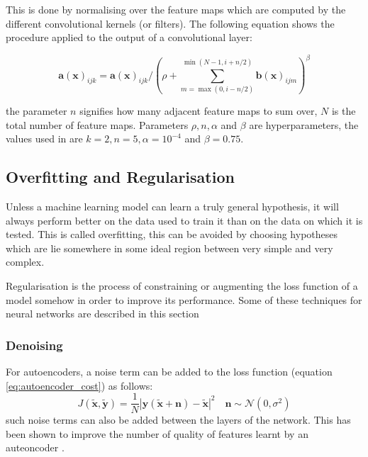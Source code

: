     This is done by normalising over the feature maps which are computed by the different convolutional kernels (or filters).
    The following equation shows the procedure applied to the output of a convolutional layer:

    \begin{equation} \label{eq:lrn}
      \mathbf{a}(\mathbf{x})_{ijk}
      = \mathbf{a}(\mathbf{x})_{ijk}/\left (\rho + \sum^{\min(N-1,i+n/2)}_{m=\max(0,i-n/2)}\mathbf{b}(\mathbf{x})_{ijm} \right )^\beta
    \end{equation}

    the parameter $n$ signifies how many adjacent feature maps to sum over, $N$ is the total number of feature maps.
    Parameters $\rho,n,\alpha$ and $\beta$ are hyperparameters, the values used in \cite{Krizhevsky2012} are
    $k=2,n=5,\alpha=10^{-4}$ and $\beta=0.75$.

  \subsection{Overfitting and Regularisation}
    Unless a machine learning model can learn a truly general hypothesis, it will always perform
    better on the data used to train it than on the data on which it is tested. This is
    called overfitting, this can be avoided by choosing hypotheses which are lie somewhere
    in some ideal region between very simple and very complex.

    Regularisation is the process of constraining or augmenting
    the loss function of a model \cite{Bishop2006} somehow in order to improve its performance.
    Some of these techniques for neural networks are described in this section
    \subsubsection{Denoising}
      For autoencoders, a noise term can be added to the loss function (equation \ref{eq:autoencoder_cost}) as follows:
      \begin{equation} \label{eq:autoencoder_cost_noise}
        J(\tilde{\mathbf{x}},\tilde{\mathbf{y}}) = \frac{1}{N}\left |\mathbf{y}(\tilde{\mathbf{x}}+\mathbf{n})-\tilde{\mathbf{x}}\right | ^2\quad \mathbf{n} \sim \mathbf{\mathcal{N}}(0,\sigma^2)
      \end{equation}
      such noise terms can also be added between the layers of the network. This
      has been shown to improve the number of quality of features learnt by an auteoncoder \cite{stacks,Vincent2008a}.
